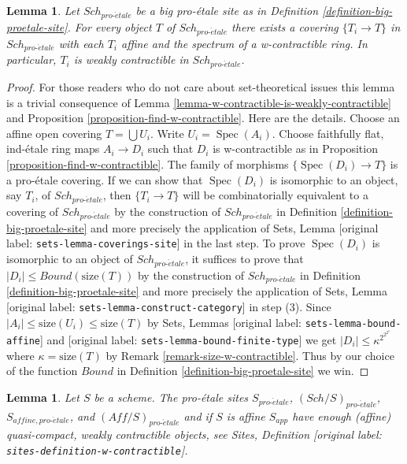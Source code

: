 \documentclass[10pt,a4paper]{article}
\theoremstyle{plain}
\newtheorem{lemma}[subsection]{Lemma}
\theoremstyle{definition}
\theoremstyle{remark}
\numberwithin{equation}{subsection}
\def\Spec{\mathop{\mathrm{Spec}}}
\def\Sch{\mathit{Sch}}
\def\proetale{{pro\text{-}\acute{e}tale}}
\begin{document}
\begin{lemma}
\label{lemma-get-many-weakly-contractible}
Let $\Sch_\proetale$ be a big pro-\'etale site as in
Definition \ref{definition-big-proetale-site}.
For every object $T$ of $\Sch_\proetale$ there exists
a covering $\{T_i \to T\}$ in $\Sch_\proetale$
with each $T_i$ affine and the spectrum of a w-contractible
ring. In particular, $T_i$ is weakly contractible in $\Sch_\proetale$.
\end{lemma}

\begin{proof}
For those readers who do not care about set-theoretical issues
this lemma is a trivial consequence of
Lemma \ref{lemma-w-contractible-is-weakly-contractible} and
Proposition \ref{proposition-find-w-contractible}.
Here are the details.
Choose an affine open covering $T = \bigcup U_i$. Write $U_i = \Spec(A_i)$.
Choose faithfully flat, ind-\'etale ring maps $A_i \to D_i$
such that $D_i$ is w-contractible as in
Proposition \ref{proposition-find-w-contractible}.
The family of morphisms $\{\Spec(D_i) \to T\}$ is a
pro-\'etale covering.
If we can show that $\Spec(D_i)$ is isomorphic to an object, say $T_i$,
of $\Sch_\proetale$, then $\{T_i \to T\}$ will be combinatorially
equivalent to a covering of $\Sch_\proetale$ by the construction
of $\Sch_\proetale$ in Definition \ref{definition-big-proetale-site}
and more precisely the application of
Sets, Lemma \textnormal{[original label: \nolinkurl{sets-lemma-coverings-site}]} in the last step.
To prove $\Spec(D_i)$ is isomorphic to an object of
$\Sch_\proetale$, it suffices to prove that
$|D_i| \leq Bound(\text{size}(T))$ by the construction
of $\Sch_\proetale$ in Definition \ref{definition-big-proetale-site}
and more precisely the application of
Sets, Lemma \textnormal{[original label: \nolinkurl{sets-lemma-construct-category}]} in step (3).
Since $|A_i| \leq \text{size}(U_i) \leq \text{size}(T)$
by Sets, Lemmas \textnormal{[original label: \nolinkurl{sets-lemma-bound-affine}]} and
\textnormal{[original label: \nolinkurl{sets-lemma-bound-finite-type}]} we get
$|D_i| \leq \kappa^{2^{2^{2^\kappa}}}$ where $\kappa = \text{size}(T)$
by Remark \ref{remark-size-w-contractible}.
Thus by our choice of the function $Bound$ in
Definition \ref{definition-big-proetale-site} we win.
\end{proof}

\begin{lemma}
\label{lemma-proetale-enough-w-contractible}
Let $S$ be a scheme. The pro-\'etale sites
$S_\proetale$, $(\Sch/S)_\proetale$, $S_{affine, \proetale}$, and
$(\textit{Aff}/S)_\proetale$ and if $S$ is affine $S_{app}$
have enough (affine) quasi-compact, weakly contractible
objects, see Sites, Definition \textnormal{[original label: \nolinkurl{sites-definition-w-contractible}]}.
\end{lemma}
\end{document}
